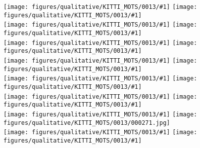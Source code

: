 \documentclass[10pt,twocolumn,letterpaper]{article}
\newcounter{row}
\begin{document}
\newcommand{\imgkittid}[1] {\texttt{[image: figures/qualitative/KITTI\_MOTS/0013/\#1]}}  
\begin{figure*}[t!]
	\centering
\imgkittid{000258.jpg}
		\vspace{1.2pt}
		\imgkittid{000259.jpg}
		\\
		
		\imgkittid{000260.jpg}
		\vspace{1.2pt}		
		\imgkittid{000261.jpg}
		\\
		
		\imgkittid{000262.jpg}
		\vspace{1.2pt}
		\imgkittid{000263.jpg}
		\\
		
		\imgkittid{000264.jpg}
		\vspace{1.2pt}
		\imgkittid{000265.jpg}
		\\
		
		\imgkittid{000266.jpg}
		\vspace{1.2pt}		
		\imgkittid{000267.jpg}
		\\


		\imgkittid{000268.jpg}
		\vspace{1.2pt}
		\imgkittid{000269.jpg}
		\\
		
		\imgkittid{000270.jpg}
		\vspace{1.2pt}
\texttt{[image: figures/qualitative/KITTI\_MOTS/0013/000271.jpg]}
		\\
		
		\imgkittid{000272.jpg}
		\vspace{1.2pt}
		\imgkittid{000273.jpg}
\vspace{-6pt}\caption{\textbf{Qualitative Results on KITTI MOTS.} In less crowded scenes, distinguishing objects works well but some erroneous detections (highlighted by red ellipses) might still happen.
	}
	\label{fig:kitti-results4}
\end{figure*}

 
\end{document}
